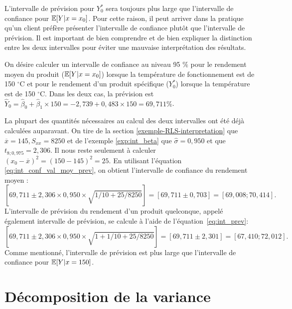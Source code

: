 \begin{remarque}
L'intervalle de prévision pour $Y_0^*$ sera toujours plus large que l'intervalle de confiance pour $\mathbb{E}[Y|x=x_0]$. Pour cette raison, il peut arriver dans la pratique qu'un client préfère présenter l'intervalle de confiance plutôt que l'intervalle de prévision. Il est important de bien comprendre et de bien expliquer la distinction entre les deux intervalles pour éviter une mauvaise interprétation des résultats.
\end{remarque}


\begin{exemple}
On désire calculer un intervalle de confiance au niveau 95 $\%$ pour le rendement moyen du produit ($\mathbb{E}[Y|x=x_0]$) lorsque la température de fonctionnement est de 150 $^{\circ}\mathrm{C}$ et pour le rendement d'un produit spécifique (${Y}_0^*$) lorsque la température est de 150 $^{\circ}\mathrm{C}$.
Dans les deux cas, la prévision est $\widehat{Y}_0 = \widehat\beta_0+ \widehat\beta_1\times150 =-2,739+0,483\times 150=69,711 \%$.

La plupart des quantités nécessaires au calcul des deux intervalles ont été déjà calculées auparavant. On tire de la section \ref{exemple-RLS-interpretation}  que $\overline x=145, S_{xx}=8250$ et de l'exemple \ref{exp:int_beta} que $\widehat\sigma=0,950$ et que $t_{8; 0,975}=2,306$. Il nous reste seulement à calculer $(x_0-\overline x)^2=(150-145)^2=25$.
En utilisant l'équation \eqref{eq:int_conf_val_moy_prev}, on obtient l'intervalle de confiance du rendement moyen :
$$\left[69,711\pm 2,306\times 0,950\times\sqrt{1/10+25/8250}\right]=\left[69,711 \pm 0,703\right]=[69,008;70,414].$$
L'intervalle de prévision du rendement d'un produit quelconque, appelé également intervalle de prévision, se calcule à l'aide de l'équation~\eqref{eq:int_prev}: 
 $$\left[69,711\pm 2,306\times 0,950\times\sqrt{1+1/10+25/8250}\right]=[69,711\pm 2,301]=[67,410;72,012].$$
Comme mentionné, l'intervalle de prévision est plus large que l'intervalle de confiance pour $\mathbb{E}[Y|x=150]$.
\end{exemple}


\section{Décomposition de la variance}
\label{sec:AnalyseDeLaVariance}




